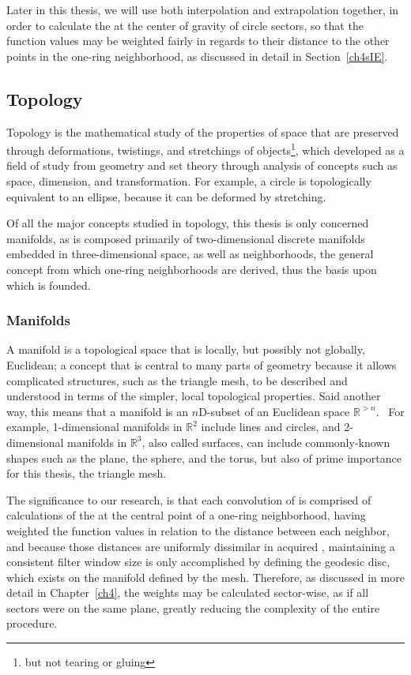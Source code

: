 Later in this thesis, we will use both interpolation and extrapolation together, in order to calculate the  at the center of gravity of circle sectors, so that the function values may be weighted fairly in regards to their distance to the other points in the one-ring neighborhood, as discussed in detail in Section~\ref{ch4sIE}.

%
%
%
%
\subsection{Topology}
\label{ch2sETBssT}
Topology is the mathematical study of the properties of space that are preserved through deformations, twistings, and stretchings of objects\footnote{but not tearing or gluing}, which developed as a field of study from geometry and set theory through analysis of concepts such as space, dimension, and transformation. For example, a circle is topologically equivalent to an ellipse, because it can be deformed by stretching.~\cite{Weisstein19c} 

Of all the major concepts studied in topology, this thesis is only concerned manifolds, as \tdd{} is composed primarily of two-dimensional discrete manifolds embedded in three-dimensional space, as well as neighborhoods, the general concept from which one-ring neighborhoods are derived, thus the basis upon which  is founded.

%
%
\subsubsection{Manifolds}
\label{ch2sETBssTsssM}
A manifold is a topological space that is locally, but possibly not globally, Euclidean; a concept that is central to many parts of geometry because it allows complicated structures, such as the triangle mesh, to be described and understood in terms of the simpler, local topological properties. Said another way, this means that a manifold is an $n$D-subset of an Euclidean space $\mathbb{R}^{>n}$.~\cite[p.~199]{Mara12} For example, 1-dimensional manifolds in $\mathbb{R}^{2}$ include lines and circles, and 2-dimensional manifolds in $\mathbb{R}^{3}$, also called surfaces, can include commonly-known shapes such as the plane, the sphere, and the torus, but also of prime importance for this thesis, the triangle mesh.

The significance to our research, is that each convolution of  is comprised of calculations of the  at the central point of a one-ring neighborhood, having weighted the function values in relation to the distance between each neighbor, and because those distances are uniformly dissimilar in acquired \tdd{}, maintaining a consistent filter window size is only accomplished by defining the geodesic disc, which exists on the manifold defined by the mesh. Therefore, as discussed in more detail in Chapter~\ref{ch4}, the weights may be calculated sector-wise, as if all sectors were on the same plane, greatly reducing the complexity of the entire procedure.


